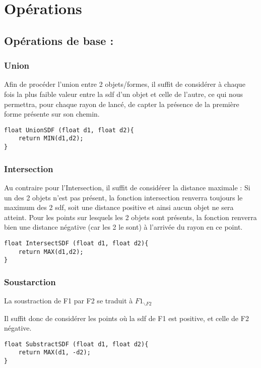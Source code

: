 \documentclass{article}
\begin{document}
\section{Opérations}
\subsection{Opérations de base :}
\subsubsection{Union}
Afin de procéder l'union entre 2 objets/formes, il suffit de considérer à chaque fois la plus faible 
valeur entre la sdf d'un objet et celle de l'autre, ce qui nous permettra, pour chaque rayon de lancé,
de capter la présence de la première forme présente sur son chemin.

\begin{lstlisting}
float UnionSDF (float d1, float d2){
    return MIN(d1,d2);
}
\end{lstlisting}

\subsubsection{Intersection}
Au contraire pour l'Intersection, il suffit de considérer la distance maximale :
Si un des 2 objets n'est pas présent, la fonction intersection renverra toujours le maximum des 2 sdf,
soit une distance positive et ainsi aucun objet ne sera atteint. Pour les points sur lesquels les 2 objets sont présents,
la fonction renverra bien une distance négative (car les 2 le sont) à l'arrivée du rayon en ce point.

\begin{lstlisting}
float IntersectSDF (float d1, float d2){
    return MAX(d1,d2);
}
\end{lstlisting}

\subsubsection{Soustarction}
La soustraction de F1 par F2 se traduit à $F1_{\backslash F2}$

Il suffit donc de considérer les points où la sdf de F1 est positive, et celle de F2 négative.

\begin{lstlisting}
float SubstractSDF (float d1, float d2){
    return MAX(d1, -d2); 
}
\end{lstlisting}
\end{document}
